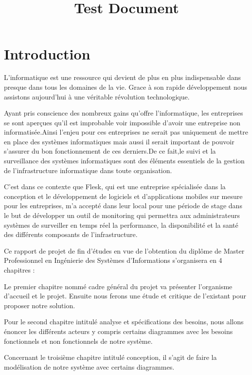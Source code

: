 \documentclass{report}
\begin{document}
\title{Test Document}
\maketitle

\section{Introduction}
L’informatique est une ressource qui devient de plus en plus indispensable dans 
presque dans tous les domaines de la vie. Grace à son rapide développement 
nous assistons aujourd’hui à une véritable révolution technologique.

Ayant pris conscience des nombreux gains qu’offre l’informatique, les entreprises se sont 
aperçues qu’il est improbable voir impossible d’avoir une entreprise non informatisée.Ainsi l'enjeu pour ces entreprises ne serait pas uniquement de mettre en place des systèmes informatiques mais aussi il serait important de pouvoir s'assurer du bon fonctionnement de ces derniers.De ce fait,le suivi et la surveillance des systèmes informatiques sont des éléments essentiels de la gestion de l'infrastructure informatique dans toute organisation. 

C’est dans ce contexte que Flesk, qui est une entreprise spécialisée dans la conception et le développement de logiciels et d'applications mobiles sur mesure pour les entreprises, m’a accepté dans leur local pour une période de stage dans le but de développer un outil de monitoring qui permettra aux administrateurs systèmes de surveiller en temps réel la performance, la disponibilité et la santé des différents composants de l'infrastructure.

Ce rapport de projet de fin d’études en vue de l’obtention du diplôme de Master Professionnel
en Ingénierie des Systèmes d’Informations s’organisera en 4 chapitres : 

Le premier chapitre nommé cadre général du projet va présenter l’organisme d’accueil et le 
projet. Ensuite nous ferons une étude et critique de l’existant pour proposer notre solution. 

Pour le second chapitre intitulé analyse et spécifications des besoins, nous allons énoncer les 
différents acteurs y compris certains diagrammes avec les besoins fonctionnels et non 
fonctionnels de notre système.

Concernant le troisième chapitre intitulé conception, il s’agit de faire la modélisation de notre 
système avec certains diagrammes.
\end{document}
